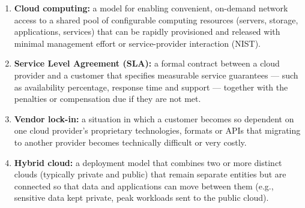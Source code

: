 \documentclass[11pt]{article}
\newcommand{\cle}[1]{{\popxbold\color{popdark}#1}}
\begin{document}
\begin{corrige}
\begin{enumerate}
\item \textbf{\cle{Cloud computing}:} a model for enabling convenient, on-demand network access to a shared pool of configurable computing resources (servers, storage, applications, services) that can be rapidly provisioned and released with minimal management effort or service-provider interaction (NIST).
\item \textbf{\cle{Service Level Agreement (SLA)}:} a formal contract between a cloud provider and a customer that specifies measurable service guarantees — such as availability percentage, response time and support — together with the penalties or compensation due if they are not met.
\item \textbf{\cle{Vendor lock-in}:} a situation in which a customer becomes so dependent on one cloud provider's proprietary technologies, formats or APIs that migrating to another provider becomes technically difficult or very costly.
\item \textbf{\cle{Hybrid cloud}:} a deployment model that combines two or more distinct clouds (typically private and public) that remain separate entities but are connected so that data and applications can move between them (e.g., sensitive data kept private, peak workloads sent to the public cloud).
\end{enumerate}
\end{corrige}
\end{document}
